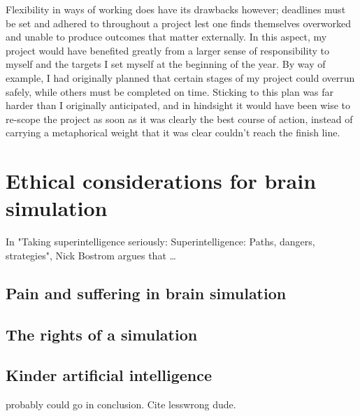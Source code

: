 Flexibility in ways of working does have its drawbacks however; deadlines must
be set and adhered to throughout a project lest one finds themselves overworked
and unable to produce outcomes that matter externally. In this aspect, my
project would have benefited greatly from a larger sense of responsibility to
myself and the targets I set myself at the beginning of the year. By way of
example, I had originally planned that certain stages of my project could
overrun safely, while others must be completed on time. Sticking to this plan
was far harder than I originally anticipated, and in hindsight it would have been
wise to re-scope the project as soon as it was clearly the best course of action,
instead of carrying a metaphorical weight that it was clear couldn't reach the
finish line.


\section{Ethical considerations for brain simulation}


In "Taking superintelligence seriously: Superintelligence: Paths, dangers,
strategies", Nick Bostrom argues that \ldots
\autocite{bostrom_superintelligence_2014}

\subsection{Pain and suffering in brain simulation}

\autocite{dan_preventing_2019}

\subsection{The rights of a simulation}

\subsection{Kinder artificial intelligence}
probably could go in conclusion. Cite lesswrong dude.

